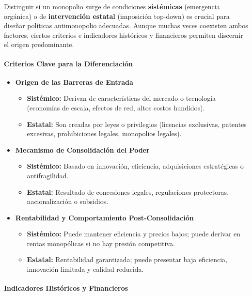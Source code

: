 \documentclass[a4paper,12pt]{article}
\begin{document}
Distinguir si un monopolio surge de condiciones \textbf{sistémicas} (emergencia orgánica) o de \textbf{intervención estatal} (imposición top-down) es crucial para diseñar políticas antimonopolio adecuadas. Aunque muchas veces coexisten ambos factores, ciertos criterios e indicadores históricos y financieros permiten discernir el origen predominante.

\paragraph{Criterios Clave para la Diferenciación}

\begin{itemize}
    \item \textbf{Origen de las Barreras de Entrada}
    \begin{itemize}
        \item \textbf{Sistémico:} Derivan de características del mercado o tecnología (economías de escala, efectos de red, altos costos hundidos).
        \item \textbf{Estatal:} Son creadas por leyes o privilegios (licencias exclusivas, patentes excesivas, prohibiciones legales, monopolios legales).
    \end{itemize}

    \item \textbf{Mecanismo de Consolidación del Poder}
    \begin{itemize}
        \item \textbf{Sistémico:} Basado en innovación, eficiencia, adquisiciones estratégicas o antifragilidad.
        \item \textbf{Estatal:} Resultado de concesiones legales, regulaciones protectoras, nacionalización o subsidios.
    \end{itemize}

    \item \textbf{Rentabilidad y Comportamiento Post-Consolidación}
    \begin{itemize}
        \item \textbf{Sistémico:} Puede mantener eficiencia y precios bajos; puede derivar en rentas monopólicas si no hay presión competitiva.
        \item \textbf{Estatal:} Rentabilidad garantizada; puede presentar baja eficiencia, innovación limitada y calidad reducida.
    \end{itemize}
\end{itemize}

\paragraph{Indicadores Históricos y Financieros}
\end{document}
